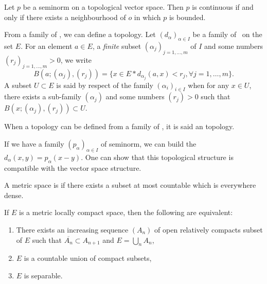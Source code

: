 \begin{proposition}
	Let $p$ be a seminorm on a topological vector space. Then $p$ is continuous if and only if there exists a neighbourhood of $o$ in which $p$ is bounded.
	\label{prop:semi_norm_cont}
\end{proposition}


From a family of \ecarts, we can define a topology. Let $(d_{\alpha})_{\alpha\in I}$ be a family of \ecarts\ on the set $E$. For an element $a\in E$, a \emph{finite} subset $(\alpha_j)_{j=1,\ldots, m}$ of $I$ and some numbers $(r_j)_{j=1,\ldots, m}>0$, we write
\[
	B(a; (\alpha_j),(r_j))=\{x\in E\ast d_{\alpha_j}(a,x)<r_j,\forall j=1,\ldots,m\}.
\]
\label{topo_semi_norm} A subset $U\subset E$ is said  by respect of the family $(\alpha_i)_{i\in I}$ when for any $x\in U$, there exists a sub-family $(\alpha_j)$ and some numbers $(r_j)>0$ such that $B(x;(\alpha_j),(r_j))\subset U$.

\begin{definition}
	When a topology can be defined from a family of \ecarts, it is said an  topology.
\end{definition}

If we have a family $(p_{\alpha})_{\alpha\in I}$ of seminorm, we can build the \ecarts\ $d_{\alpha}(x,y)=p_{\alpha}(x-y)$. One can show that this topological structure is compatible with the vector space structure.


\begin{definition}
	A metric space is  if there exists a subset at most countable which is everywhere dense.
\end{definition}

\begin{proposition}
	If $E$ is a metric locally compact space, then the following are equivalent:
	\begin{enumerate}
		\item There exists an increasing sequence $(A_n)$ of open relatively compacts subset of $E$ such that $\overline{A_n}\subset A_{n+1}$ and $E=\bigcup_n A_n$,

		\item $E$ is a countable union of compact subsets,

		\item $E$ is separable.
	\end{enumerate}
\end{proposition}

